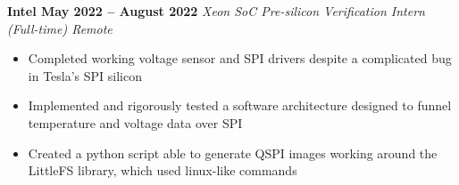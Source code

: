 \documentclass[../main.tex]{subfiles}
\begin{document}
%
\noindent\textbf{{\fontsize{\textFontSize}{\textFontBox}\selectfont Intel \hfill May 2022 – August 2022}}
\vspace{\jobHeaderDist}\newline
%
{\fontsize{\textFontSize}{\textFontBox}\selectfont\emph{Xeon SoC Pre-silicon Verification Intern (Full-time) \hfill Remote \hspace{0 cm}}}\newline
\vspace{\listHeight}
%
%
\begin{itemize}
  \setlength{\itemindent}{-6mm}
  \vspace{\listItemDist}\item {\fontsize{\textFontSize}{\textFontBox}\selectfont Completed working voltage sensor and SPI drivers despite a complicated bug in Tesla’s SPI silicon}
  \vspace{\listItemDistTwo}\item {\fontsize{\textFontSize}{\textFontBox}\selectfont Implemented and rigorously tested a software architecture designed to funnel temperature and voltage data over SPI}
  \vspace{\listItemDistTwo}\item {\fontsize{\textFontSize}{\textFontBox}\selectfont Created a python script able to generate QSPI images working around the LittleFS library, which used linux-like commands}
\end{itemize}
%
%
\vspace{-0.1cm}
%
\end{document}
